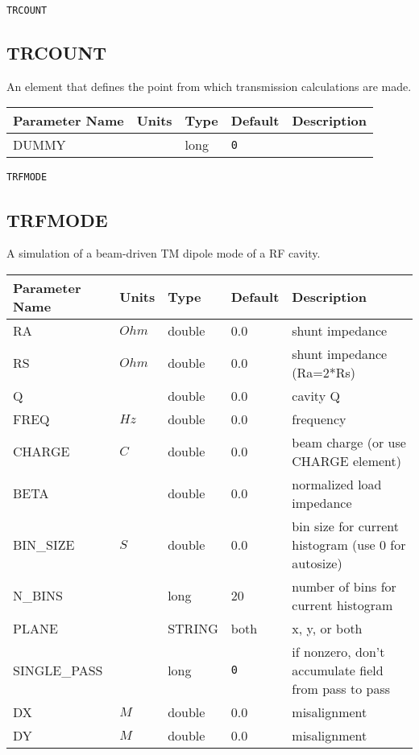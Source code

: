 \begin{latexonly}
\newpage
\begin{center}{\Large\verb|TRCOUNT|}\end{center}
\end{latexonly}\subsection{TRCOUNT}
An element that defines the point from which transmission calculations are made.
\\
\begin{tabular}{|l|l|l|l|p{\descwidth}|} \hline
Parameter Name & Units & Type & Default & Description \\ \hline 
DUMMY &  & long &  \verb|0| & \\ \hline 
\end{tabular}

\begin{latexonly}
\newpage
\begin{center}{\Large\verb|TRFMODE|}\end{center}
\end{latexonly}\subsection{TRFMODE}
A simulation of a beam-driven TM dipole mode of a RF cavity.
\\
\begin{tabular}{|l|l|l|l|p{\descwidth}|} \hline
Parameter Name & Units & Type & Default & Description \\ \hline 
RA & $Ohm$ & double &  0.0 & shunt impedance  \\ \hline 
RS & $Ohm$ & double &  0.0 & shunt impedance (Ra=2*Rs)  \\ \hline 
Q &  & double &  0.0 & cavity Q  \\ \hline 
FREQ & $Hz$ & double &  0.0 & frequency  \\ \hline 
CHARGE & $C$ & double &  0.0 & beam charge (or use CHARGE element)  \\ \hline 
BETA &  & double &  0.0 & normalized load impedance  \\ \hline 
BIN\_SIZE & $S$ & double &  0.0 & bin size for current histogram (use 0 for autosize)  \\ \hline 
N\_BINS &  & long &   20              & number of bins for current histogram  \\ \hline 
PLANE &  & STRING &   both            & x, y, or both  \\ \hline 
SINGLE\_PASS &  & long &  \verb|0| & if nonzero, don't accumulate field from pass to pass  \\ \hline 
DX & $M$ & double &  0.0 & misalignment  \\ \hline 
DY & $M$ & double &  0.0 & misalignment  \\ \hline 
\end{tabular}

